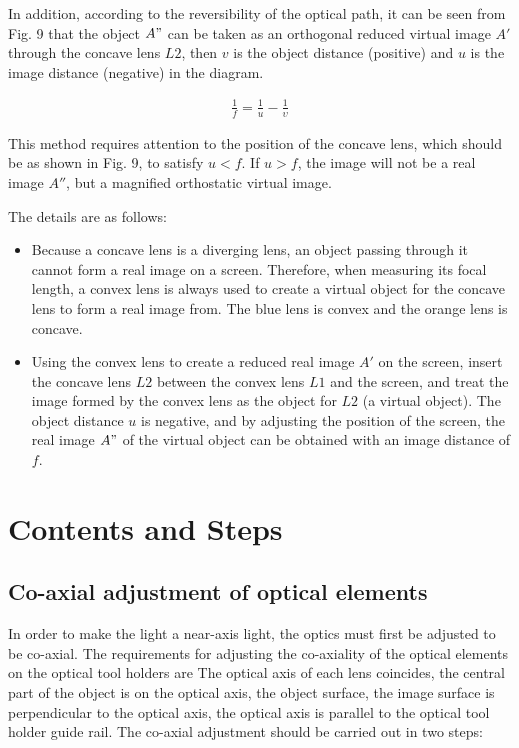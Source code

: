 \documentclass[UTF8]{article}
\begin{document}
    In addition, according to the reversibility of the optical path, it can be seen from Fig. 9 that the object $A"$ can be taken as an orthogonal reduced virtual image $A'$ through the concave lens $L2$, then $v$ is the object distance (positive) and $u$ is the image distance (negative) in the diagram.
    
    \begin{eqnarray}
    \frac{1}{f}  = \frac{1}{u}-\frac{1}{\upsilon }   
    \end{eqnarray}
    
    This method requires attention to the position of the concave lens, which should be as shown in Fig. 9, to satisfy $u < f$. If $u > f$, the image will not be a real image $A''$, but a magnified orthostatic virtual image.
    
    The details are as follows:
    \begin{itemize}
    \item Because a concave lens is a diverging lens, an object passing through it cannot form a real image on a screen. Therefore, when measuring its focal length, a convex lens is always used to create a virtual object for the concave lens to form a real image from. The blue lens is convex and the orange lens is concave.
    \item Using the convex lens to create a reduced real image $A'$ on the screen, insert the concave lens $L2$ between the convex lens $L1$ and the screen, and treat the image formed by the convex lens as the object for $L2$ (a virtual object). The object distance $u$ is negative, and by adjusting the position of the screen, the real image $A"$ of the virtual object can be obtained with an image distance of $f$.
    \end{itemize}
    

	\section{Contents and Steps}
	\subsection{Co-axial adjustment of optical elements}
	In order to make the light a near-axis light, the optics must first be adjusted to be co-axial. The requirements for adjusting the co-axiality of the optical elements on the optical tool holders are The optical axis of each lens coincides, the central part of the object is on the optical axis, the object surface, the image surface is perpendicular to the optical axis, the optical axis is parallel to the optical tool holder guide rail. The co-axial adjustment should be carried out in two steps:
\end{document}
